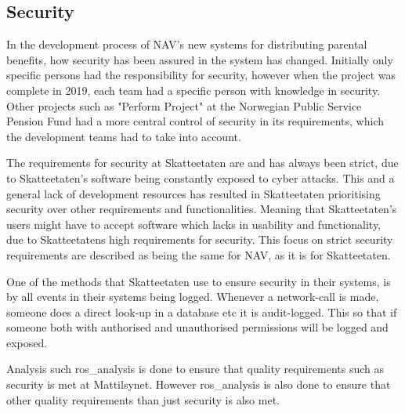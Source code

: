 \subsection{Security}
In the development process of NAV's new systems for distributing parental benefits, how security has been assured in the system has changed. Initially only specific persons had the responsibility for security, however when the project was complete in 2019, each team had a specific person with knowledge in security. Other projects such as "Perform Project" at the Norwegian Public Service Pension Fund had a more central control of security in its requirements, which the development teams had to take into account.

The requirements for security at Skatteetaten are and has always been strict, due to Skatteetaten's software  being constantly exposed to cyber attacks. This and a general lack of development resources has resulted in Skatteetaten prioritising security over other requirements and functionalities. Meaning that Skatteetaten's users might have to accept software which lacks in usability and functionality, due to Skatteetatens high requirements for security. This focus on strict security requirements are described as being the same for NAV, as it is for Skatteetaten.

One of the methods that Skatteetaten use to ensure security in their systems, is by all events in their systems being logged. Whenever a network-call is made, someone does a direct look-up in a database etc it is audit-logged. This so that if someone both with authorised and unauthorised permissions will be logged and exposed.

Analysis such \gls{ros_analysis} is done to ensure that quality requirements such as security is met at Mattilsynet. However \gls{ros_analysis} is also done to ensure that other quality requirements than just security is also met.




